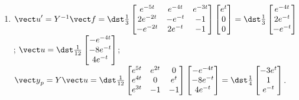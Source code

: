 \documentclass[openany]{book}
\newenvironment{sectionSolutions}{
 \begin{enumerate}[item-label={\thesection.\arabic{enumi}.}]
}{
 \end{enumerate}
}
\begin{document}
\begin{sectionSolutions}
\item
${\vect u}'=Y^{-1}{\vect f}=
\dst\frac{1}{3}\begin{bmatrix}e^{-5t}&e^{-4t}&e^{-3t}\\
2e^{-2t}&-e^{-t}&-1\\-e^{-2t}&2e^{-t}&-1\end{bmatrix}
\begin{bmatrix}e^t\\0\\0\end{bmatrix}=
\dst\frac{1}{3}\begin{bmatrix}
e^{-4t}\\2e^{-t}\\-e^{-t}\end{bmatrix}$;
${\vect u}=
\dst\frac{1}{12}\begin{bmatrix}
-e^{-4t}\\-8e^{-t}\\4e^{-t}\end{bmatrix}$;
${\vect y}_p=Y{\vect u}=
\dst\frac{1}{12}\begin{bmatrix}e^{5t}&e^{2t}&0\\
e^{4t}&0&e^t\\e^{3t}&-1&-1\end{bmatrix}
\begin{bmatrix}
-e^{-4t}\\-8e^{-t}\\4e^{-t}\end{bmatrix}=
\dst\frac{1}{4}\begin{bmatrix}-3e^t\\
1\\e^{-t}\end{bmatrix}$.



\end{sectionSolutions}
\end{document}
